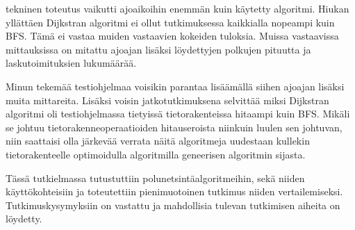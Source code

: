 tekninen toteutus vaikutti ajoaikoihin enemmän kuin käytetty algoritmi. 
Hiukan yllättäen Dijkstran algoritmi ei ollut tutkimuksessa kaikkialla 
nopeampi kuin BFS. Tämä ei vastaa muiden vastaavien kokeiden tuloksia.
\cite{mazeGameTrilogi} Muissa vastaavissa mittauksissa on mitattu ajoajan 
lisäksi löydettyjen polkujen pituutta ja laskutoimituksien lukumäärää.
\cite{mazeGameTrilogi}\cite{pPacman} \par
	Minun tekemää testiohjelmaa voisikin parantaa lisäämällä siihen 
ajoajan lisäksi muita mittareita. Lisäksi voisin jatkotutkimuksena selvittää 
miksi Dijkstran algoritmi oli testiohjelmassa tietyissä tietorakenteissa 
hitaampi kuin BFS. Mikäli se johtuu tietorakenneoperaatioiden hitauseroista 
niinkuin luulen sen johtuvan, niin saattaisi olla järkevää verrata näitä 
algoritmeja uudestaan kullekin tietorakenteelle optimoidulla algoritmilla 
geneerisen algoritmin sijasta. \par
	Tässä tutkielmassa tutustuttiin polunetsintäalgoritmeihin, sekä 
niiden käyttökohteisiin ja toteutettiin pienimuotoinen tutkimus niiden 
vertailemiseksi. Tutkimuskysymyksiin on vastattu ja mahdollisia tulevan 
tutkimisen aiheita on löydetty.

